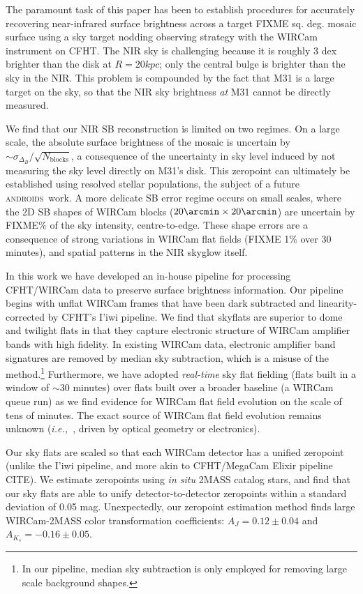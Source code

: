 \documentclass[iop]{emulateapj}
\newcommand{\ie}{\textit{i.e.,~}}
\newcommand{\androids}{\textsc{androids}}
\begin{document}
The paramount task of this paper has been to establish procedures for accurately recovering near-infrared surface brightness across a target FIXME sq. deg. mosaic surface using a sky target nodding observing strategy with the WIRCam instrument on CFHT. The NIR sky is challenging because it is roughly 3 dex brighter than the disk at $R=20 kpc$; only the central bulge is brighter than the sky in the NIR. This problem is compounded by the fact that M31 is a large target on the sky, so that the NIR sky brightness \emph{at} M31 cannot be directly measured.

We find that our NIR SB reconstruction is limited on two regimes. On a large scale, the absolute surface brightness of the mosaic is uncertain by $\sim \sigma_{\Delta_B} / \sqrt{N_\mathrm{blocks}}$, a consequence of the uncertainty in sky level induced by  not measuring the sky level directly on M31's disk. This zeropoint can ultimately be established using resolved stellar populations, the subject of a future \androids\ work. A more delicate SB error regime occurs on small scales, where the 2D SB shapes of WIRCam blocks ($20\arcmin\times20\arcmin$) are uncertain by FIXME\% of the sky intensity, centre-to-edge. These shape errors are a consequence of strong variations in WIRCam flat fields (FIXME 1\% over 30 minutes), and spatial patterns in the NIR skyglow itself. 

In this work we have developed an in-house pipeline for processing CFHT/WIRCam data to preserve surface brightness information. Our pipeline begins with unflat WIRCam frames that have been dark subtracted and linearity-corrected by CFHT's I'iwi pipeline. We find that skyflats are superior to dome and twilight flats in that they capture electronic structure of WIRCam amplifier bands with high fidelity. In existing WIRCam data, electronic amplifier band signatures are removed by median sky subtraction, which is a misuse of the method.\footnote{In our pipeline, median sky subtraction is only employed for removing large scale background shapes.} Furthermore, we have adopted \emph{real-time} sky flat fielding (flats built in a window of $\sim 30$ minutes) over flats built over a broader baseline (a WIRCam queue run) as we find evidence for WIRCam flat field evolution on the scale of tens of minutes. The exact source of WIRCam flat field evolution remains unknown (\ie, driven by optical geometry or electronics).

Our sky flats are scaled so that each WIRCam detector has a unified zeropoint (unlike the I'iwi pipeline, and more akin to CFHT/MegaCam Elixir pipeline CITE). We estimate zeropoints using \emph{in situ} 2MASS catalog stars, and find that our sky flats are able to unify detector-to-detector zeropoints within a standard deviation of 0.05 mag. Unexpectedly, our zeropoint estimation method finds large WIRCam-2MASS color transformation coefficients: $A_J = 0.12 \pm 0.04$ and $A_{K_s} = -0.16 \pm 0.05$.
\end{document}
